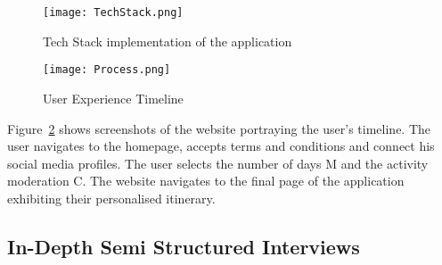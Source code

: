 \begin{figure}[h]
\centering
\texttt{[image: TechStack.png]}
\caption{Tech Stack implementation of the application} \label{TechStack}
\end{figure}

\begin{figure}[h]
\centering
\texttt{[image: Process.png]}
\caption{User Experience Timeline}
\label{Timeline}
\end{figure}

Figure~\ref{Timeline} shows screenshots of the website portraying
the user's timeline.  The user navigates to the
homepage, accepts terms and conditions and connect his
social media profiles.  The user selects the number of
days M and the activity moderation C.  The website
navigates to the final page of the application
exhibiting their personalised itinerary. 
\subsection{In-Depth Semi Structured Interviews}
